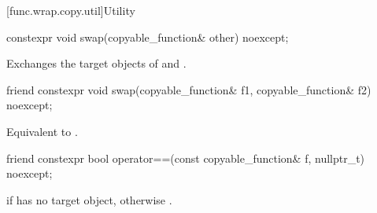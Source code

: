 [func.wrap.copy.util]{Utility}

%
\begin{itemdecl}
constexpr void swap(copyable_function& other) noexcept;
\end{itemdecl}

\begin{itemdescr}
\pnum
\effects
Exchanges the target objects of  and .
\end{itemdescr}

%
\begin{itemdecl}
friend constexpr void swap(copyable_function& f1, copyable_function& f2) noexcept;
\end{itemdecl}

\begin{itemdescr}
\pnum
\effects
Equivalent to .
\end{itemdescr}

%
\begin{itemdecl}
friend constexpr bool operator==(const copyable_function& f, nullptr_t) noexcept;
\end{itemdecl}

\begin{itemdescr}
\pnum
\returns
{} if  has no target object, otherwise .
\end{itemdescr}
